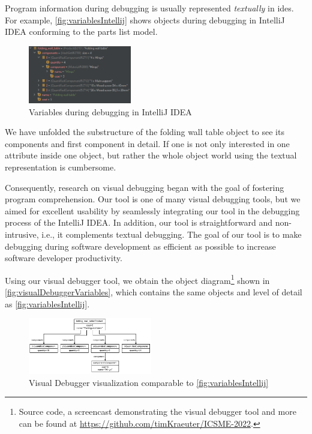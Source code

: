 \documentclass[conference]{IEEEtran}
\newcommand{\intellij}{IntelliJ IDEA}
\begin{document}
Program information during debugging is usually represented \textit{textually} in \glspl*{ide}.
For example, \autoref{fig:variablesIntellij} shows objects during debugging in \intellij{} conforming to the parts list model. 

\begin{figure}[h]
    \centering
    \includegraphics[width=0.4\textwidth]{images/variables.png}
    \caption{Variables during debugging in \intellij}
    \label{fig:variablesIntellij}
\end{figure}

We have unfolded the substructure of the \textsf{folding wall table} object to see its components and first component in detail.
If one is not only interested in one attribute inside one object, but rather the whole object world using the textual representation is cumbersome.

Consequently, research on visual debugging began with the goal of fostering program comprehension.
Our tool is one of many visual debugging tools, but we aimed for excellent usability by seamlessly integrating our tool in the debugging process of the \intellij{}.
In addition, our tool is straightforward and non-intrusive, i.e., it complements textual debugging.
The goal of our tool is to make debugging during software development as efficient as possible to increase software developer productivity.

Using our visual debugger tool, we obtain the object diagram\footnote{\label{footnote:artifacts} Source code, a screencast demonstrating the visual debugger tool and more can be found at \url{https://github.com/timKraeuter/ICSME-2022}.} shown in \autoref{fig:visualDebuggerVariables}, which contains the same objects and level of detail as \autoref{fig:variablesIntellij}.

\begin{figure}[h]
    \centering
    \includegraphics[width=0.48\textwidth]{images/VD-parts list object diagram.pdf}
    \caption{Visual Debugger visualization comparable to \autoref{fig:variablesIntellij}}
    \label{fig:visualDebuggerVariables}
\end{figure}
\end{document}
